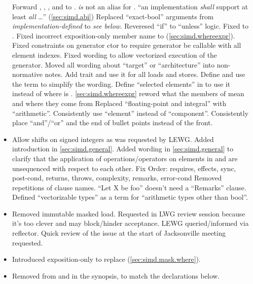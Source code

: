 \begin{itemize}
  \chck Forward , , , and  to .
  \chck {} \emph{is} not an alias for .
  \chck “an implementation \emph{shall} support at least \emph{all} \ldots” (\ref{sec:simd.abi})
  \chck Replaced “exact-bool” arguments from \emph{implementation-defined} to \emph{see below}.
  \chck Reveresed “if” to “unless” logic.
  \chck Fixed  to .
  \chck Fixed incorrect  exposition-only member name to  (\ref{sec:simd.whereexpr}).
  \chck Fixed constraints on generator ctor to require generator be callable with all element indexes.
  \chck Fixed wording to allow vectorized execution of the generator.
  \chck Moved all wording about “target” or “architecture” into non-normative notes.
  \chck Add  trait and use it for all loads and stores.
  \chck Define and use the term \emph{\realArithmeticType} to simplify the wording.
  \chck Define “selected elements” in  to use it instead of  where  is \true.
  \chck \ref{sec:simd.whereexpr} reword what the members of  mean and where they come from
  \chck Replaced “floating-point and integral” with “arithmetic”.
  \chck Consistently use “element” instead of “component”.
  \chck Consistently place “and”/“or” and the end of bullet points instead of the front.
  \item Allow shifts on signed integers as was requested by LEWG.
  \chck Added introduction in \ref{sec:simd.general}.
  \chck Added wording in \ref{sec:simd.general} to clarify that the application of operations/operators on elements in \simd and \mask are unsequenced with respect to each other.
  \chck Fix Order: requires, effects, sync, post-cond, returns, throws, complexity, remarks, error-cond
  \chck Removed repetitions of clause names.
  \chck “Let X be foo” doesn't need a “Remarks” clause.
  \chck Defined “vectorizable types” as a term for “arithmetic types other than bool”.
  \item Removed immutable masked load.
    Requested in LWG review session because it's too clever and may block/hinder acceptance.
    LEWG queried/informed via reflector.
    Quick review of the issue at the start of Jacksonville meeting requested.
  \item Introduced exposition-only  to replace  (\ref{sec:simd.mask.where}).
  \item Removed  from  and  in the synopsis, to match the declarations below.

\end{itemize}

